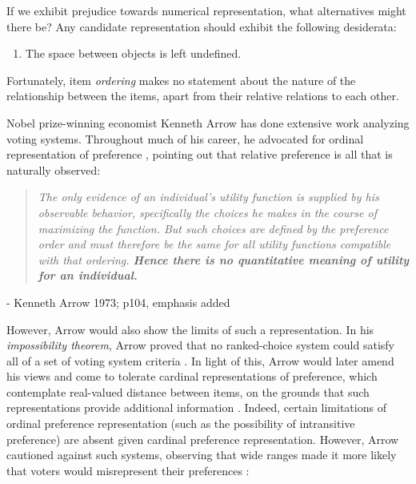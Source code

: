 If we exhibit prejudice towards numerical representation, what alternatives might there be? Any candidate representation should exhibit the following desiderata:

\begin{enumerate}
  \item The space between objects is left undefined.
\end{enumerate}

Fortunately, item \textit{ordering} makes no statement about the nature of the relationship between the items, apart from their relative relations to each other.

\bigskip

Nobel prize-winning economist Kenneth Arrow has done extensive work analyzing voting systems.
Throughout much of his career, he advocated for ordinal representation of preference \cite{bianchi}, pointing out that relative preference is all that is naturally observed:

\begin{center}
	\begin{quotation}
\textit{
	The only evidence of an individual's utility function is supplied by his observable behavior, specifically the choices he makes in the course of maximizing the function.
	But such choices are defined by the preference order and must therefore be the same for all utility functions compatible with that ordering.
	\textbf{Hence there is no quantitative meaning of utility for an individual.}
	}
\end{quotation}
- Kenneth Arrow 1973; p104, emphasis added
\end{center}

However, Arrow would also show the limits of such a representation.
In his \textit{impossibility theorem}, Arrow proved that no ranked-choice system could satisfy all of a set of voting system criteria \cite{arrow}.
In light of this, Arrow would later amend his views and come to tolerate cardinal representations of preference, which contemplate real-valued distance between items, on the grounds that such representations provide additional information \cite{hamlin}.
Indeed, certain limitations of ordinal preference representation (such as the possibility of intransitive preference) are absent given cardinal preference representation.
However, Arrow cautioned against such systems, observing that wide ranges made it more likely that voters would misrepresent their preferences \cite{hamlin}:  

